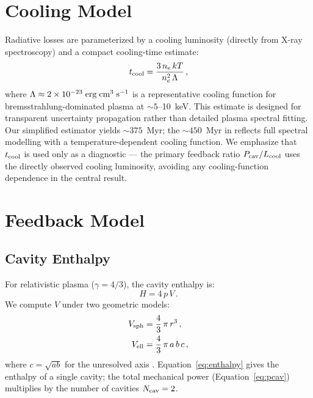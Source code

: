 \documentclass[twocolumn]{aastex63}
\newcommand{\Lcool}{L_{\rm cool}}
\newcommand{\Pcav}{P_{\rm cav}}
\newcommand{\erg}{\rm erg}
\newcommand{\s}{\rm s}
\newcommand{\cm}{\rm cm}
\begin{document}
\section{Cooling Model}
\label{sec:cooling}

Radiative losses are parameterized by a cooling luminosity (directly from X-ray
spectroscopy) and a compact cooling-time estimate:
\begin{equation}
  \label{eq:tcool}
  t_{\rm cool} = \frac{3\,n_e\,kT}{n_e^2\,\Lambda}\,,
\end{equation}
where $\Lambda \approx 2 \times 10^{-23}\;\erg\;\cm^{3}\;\s^{-1}$ is a
representative cooling function for bremsstrahlung-dominated plasma at
${\sim}5$--10~keV. This estimate is designed for transparent
uncertainty propagation rather than detailed plasma spectral fitting. Our
simplified estimator yields ${\sim}375$~Myr; the ${\sim}450$~Myr in
\citet{McDonald2019} reflects full spectral modelling with a
temperature-dependent cooling function. We emphasize that $t_{\rm cool}$ is
used only as a diagnostic --- the primary feedback ratio
$\Pcav/\Lcool$ uses the directly observed cooling luminosity, avoiding any
cooling-function dependence in the central result.

\section{Feedback Model}
\label{sec:feedback}

\subsection{Cavity Enthalpy}
\label{sec:enthalpy}

For relativistic plasma ($\gamma = 4/3$), the cavity enthalpy is:
\begin{equation}
  \label{eq:enthalpy}
  H = 4\,p\,V\,.
\end{equation}
We compute $V$ under two geometric models:
\begin{align}
  \label{eq:vsphere}
  V_{\rm sph} &= \frac{4}{3}\,\pi\,r^3\,, \\
  \label{eq:vellip}
  V_{\rm ell} &= \frac{4}{3}\,\pi\,a\,b\,c\,,
\end{align}
where $c = \sqrt{ab}$ for the unresolved axis \citep{Birzan2004}.
Equation~\eqref{eq:enthalpy} gives the enthalpy of a single cavity; the total
mechanical power (Equation~\eqref{eq:pcav}) multiplies by the number of
cavities $N_{\rm cav} = 2$.
\end{document}
